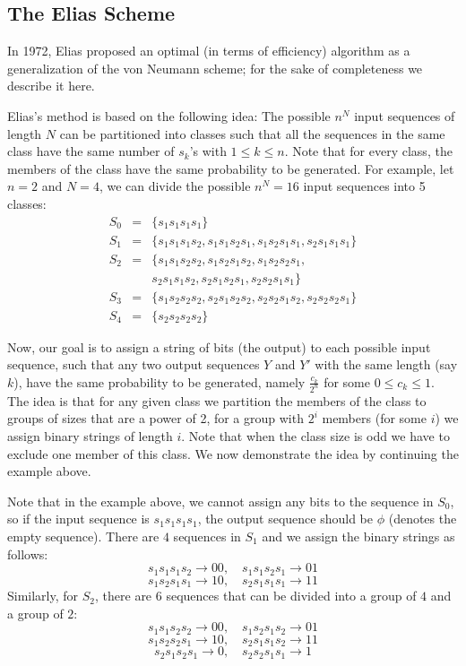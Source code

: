 \documentclass[journal]{IEEEtran}
\begin{document}
\subsection{The Elias Scheme}

In 1972, Elias \cite{Elias1972} proposed an optimal (in terms of efficiency) algorithm
as a generalization of the von Neumann scheme; for the sake of completeness we describe it here.

Elias's method is based on the following idea: The possible $n^N$ input sequences of length $N$ can be partitioned into classes
such that all the sequences in the same class have the same number of $s_k$'s with $1\leq k\leq n$. Note that for every class, the members of the class have the same probability to be generated. For example, let $n=2$ and $N=4$, we can divide the possible $n^N=16$
input sequences into 5 classes:
\begin{eqnarray*}
  S_0&=& \{s_1s_1s_1s_1\}\\
  S_1&=& \{s_1s_1s_1s_2,s_1s_1s_2s_1,s_1s_2s_1s_1,s_2s_1s_1s_1\}\\
  S_2&=& \{s_1s_1s_2s_2,s_1s_2s_1s_2,s_1s_2s_2s_1,\\
  &&s_2s_1s_1s_2,s_2s_1s_2s_1,s_2s_2s_1s_1\}\\
  S_3&=&\{s_1s_2s_2s_2,s_2s_1s_2s_2,s_2s_2s_1s_2,s_2s_2s_2s_1\}\\
  S_4&=&\{s_2s_2s_2s_2\}
\end{eqnarray*}

Now, our goal is to assign a string of bits (the output) to each possible input sequence, such that any two output sequences $Y$ and $Y'$ with the same length (say $k$), have the same probability to be generated, namely $\frac{c_k}{2^n}$ for some $0\leq c_k\leq 1$. The idea is that for any given class we partition the members of the class to groups of sizes that are a power of 2, for a group with $2^i$ members (for some $i$) we assign binary strings of length $i$. Note that when the class size is odd we have to exclude one member of this class. We now demonstrate the idea by continuing
the example above.

Note that in the example above, we cannot assign any bits to the sequence in $S_0$, so if the input sequence is $s_1s_1s_1s_1$,
the output sequence should be $\phi$ (denotes the empty sequence). There are $4$ sequences in $S_1$ and we assign the binary strings as follows:
$$s_1s_1s_1s_2\rightarrow 00,\quad s_1s_1s_2s_1\rightarrow 01$$
$$s_1s_2s_1s_1\rightarrow 10,\quad s_2s_1s_1s_1\rightarrow 11$$
Similarly, for $S_2$, there are $6$ sequences that can be divided into a group of $4$
and a group of $2$:
$$s_1s_1s_2s_2\rightarrow 00, \quad  s_1s_2s_1s_2\rightarrow 01$$
$$s_1s_2s_2s_1\rightarrow 10, \quad  s_2s_1s_1s_2\rightarrow 11$$
$$s_2s_1s_2s_1\rightarrow 0, \quad  s_2s_2s_1s_1\rightarrow 1$$
\end{document}
